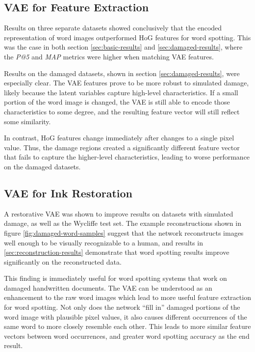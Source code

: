 \documentclass[final]{ukthesis}
\begin{document}
\subsection{VAE for Feature Extraction}
Results on three separate datasets showed conclusively that the encoded representation of word images outperformed HoG features for word spotting. This was the case in both section \ref{sec:basic-results} and \ref{sec:damaged-results}, where the {\em P@5} and {\em MAP} metrics were higher when matching VAE features.

Results on the damaged datasets, shown in section \ref{sec:damaged-results}, were especially clear.  The VAE features prove to be more robust to simulated damage, likely because the latent variables capture high-level characteristics. If a small portion of the word image is changed, the VAE is still able to encode those characteristics to some degree, and the resulting feature vector will still reflect some similarity.

In contrast, HoG features change immediately after changes to a single pixel value. Thus, the damage regions created a significantly different feature vector that fails to capture the higher-level characteristics, leading to worse performance on the damaged datasets.


\subsection{VAE for Ink Restoration}
A restorative VAE was shown to improve results on datasets with simulated damage, as well as the Wycliffe test set. The example reconstructions shown in figure \ref{fig:damaged-word-samples} suggest that the network reconstructs images well enough to be visually recognizable to a human, and results in \ref{sec:reconstruction-results} demonstrate that word spotting results improve significantly on the reconstructed data.

This finding is immediately useful for word spotting systems that work on damaged handwritten documents. The VAE can be understood as an enhancement to the raw word images which lead to more useful feature extraction for word spotting. Not only does the network ``fill in'' damaged portions of the word image with plausible pixel values, it also causes different occurrences of the same word to more closely resemble each other. This leads to more similar feature vectors between word occurrences, and greater word spotting accuracy as the end result.
\end{document}

